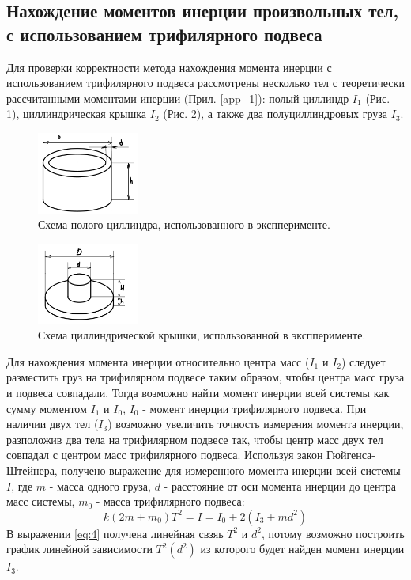 \documentclass[12pt]{article}
\begin{document}
\subsection{Нахождение моментов инерции произвольных тел, с использованием трифилярного подвеса}
Для проверки корректности метода нахождения момента инерции с использованием трифилярного подвеса рассмотрены несколько тел с теоретически 
рассчитанными моментами инерции (Прил. \ref{app_1}): полый циллиндр $I_1$ (Рис. \ref{fig:2}), циллиндрическая крышка $I_2$ (Рис. \ref{fig:3}), 
а также два полуциллиндровых груза $I_3$. 
\begin{figure}
    \begin{center}
        \includegraphics[width=0.3\textwidth]{body1.png}
    \end{center}
    \caption{Схема полого циллиндра, использованного в экспперименте.}
    \label{fig:2}
\end{figure}
\begin{figure}
    \begin{center}
        \includegraphics[width=0.3\textwidth]{body3.png}
    \end{center}
    \caption{Схема циллиндрической крышки, использованной в экспперименте.}
    \label{fig:3}
\end{figure}
Для нахождения момента инерции относительно центра масс ($I_1$ и $I_2$) следует разместить груз на трифилярном подвесе таким образом, чтобы
центра масс груза и подвеса совпадали. Тогда возможно найти момент инерции всей системы как сумму моментом $I_1$ и $I_0$, $I_0$ - момент инерции
трифилярного подвеса.
При наличии двух тел ($I_3$) возможно увеличить точность измерения момента инерции, разположив два тела на трифилярном подвесе так, чтобы центр масс двух 
тел совпадал с центром масс трифилярного подвеса. Используя закон Гюйгенса-Штейнера, получено выражение для измеренного момента инерции всей 
системы $I$, где $m$ - масса одного груза, $d$ - расстояние от оси момента инерции до центра масс системы, $m_0$ - масса трифилярного подвеса:
\begin{equation}\label{eq:4}
    k(2m + m_0)T^2 = I = I_0 + 2(I_3 + md^2)
\end{equation}
В выражении \ref{eq:4} получена линейная свзяь $T^2$ и $d^2$, потому возможно построить график линейной зависимости $T^2(d^2)$ из которого 
будет найден момент инерции $I_3$.
\end{document}
